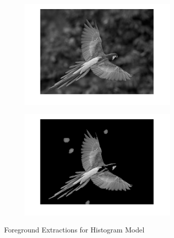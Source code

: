 \documentclass[a4paper]{article}
\begin{document}
\begin{figure}[h]
\begin{subfigure}{.5\textwidth}
  \centering
  \includegraphics[width = 3in]{parrot_input_h.png}
  \label{fig:sfig2}
\end{subfigure}
\begin{subfigure}{.5\textwidth}
  \centering
  \includegraphics[width = 3in]{parrot_output_h.png}
  \label{fig:sfig2}
\end{subfigure}

\caption{Foreground Extractions for Histogram Model}
\end{figure}
\end{document}
